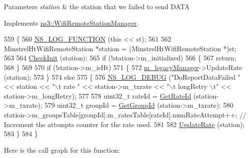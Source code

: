 \begin{DoxyParams}{Parameters}
{\em station} & the station that we failed to send D\+A\+TA \\
\hline
\end{DoxyParams}


Implements \hyperlink{classns3_1_1WifiRemoteStationManager_a38a4401b6232cb547f5a85337e02b12c}{ns3\+::\+Wifi\+Remote\+Station\+Manager}.


\begin{DoxyCode}
559 \{
560   \hyperlink{log-macros-disabled_8h_a90b90d5bad1f39cb1b64923ea94c0761}{NS\_LOG\_FUNCTION} (\textcolor{keyword}{this} << st);
561 
562   MinstrelHtWifiRemoteStation *station = (MinstrelHtWifiRemoteStation *)st;
563 
564   \hyperlink{classns3_1_1MinstrelHtWifiManager_a7f94804a34efa6121bdfd5d01ac34694}{CheckInit} (station);
565   \textcolor{keywordflow}{if} (!station->m\_initialized)
566     \{
567       \textcolor{keywordflow}{return};
568     \}
569 
570   \textcolor{keywordflow}{if} (!station->m\_isHt)
571     \{
572       \hyperlink{classns3_1_1MinstrelHtWifiManager_ae10ffd948e46a60593b1aef80372082a}{m\_legacyManager}->UpdateRate (station);
573     \}
574   \textcolor{keywordflow}{else}
575     \{
576       \hyperlink{group__logging_ga413f1886406d49f59a6a0a89b77b4d0a}{NS\_LOG\_DEBUG} (\textcolor{stringliteral}{"DoReportDataFailed "} << station << \textcolor{stringliteral}{"\(\backslash\)t rate "} << station->m\_txrate << \textcolor{stringliteral}{"\(\backslash\)t
      longRetry \(\backslash\)t"} << station->m\_longRetry);
577 
578       uint32\_t rateId = \hyperlink{classns3_1_1MinstrelHtWifiManager_a6162341f1348bbe713d09642b09ac658}{GetRateId} (station->m\_txrate);
579       uint32\_t groupId = \hyperlink{classns3_1_1MinstrelHtWifiManager_a43157e6007b4b922043cb02a99ea6d1f}{GetGroupId} (station->m\_txrate);
580       station->m\_groupsTable[groupId].m\_ratesTable[rateId].numRateAttempt++; \textcolor{comment}{// Increment the attempts
       counter for the rate used.}
581 
582       \hyperlink{classns3_1_1MinstrelHtWifiManager_abb282b56803faf26139d0db929b09b22}{UpdateRate} (station);
583     \}
584 \}
\end{DoxyCode}


Here is the call graph for this function\+:


